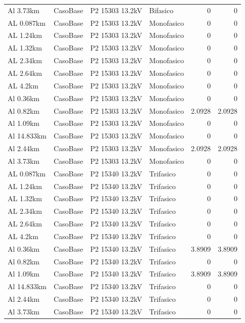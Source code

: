 \documentclass[11pt,a4paper]{article}
\begin{document}
\begin{longtable}{llllrr}
Al 3.73km & CasoBase & P2 15303 13.2kV & Bifasico & 0 & 0 \\
AL 0.087km & CasoBase & P2 15303 13.2kV & Monofasico & 0 & 0 \\
AL 1.24km & CasoBase & P2 15303 13.2kV & Monofasico & 0 & 0 \\
AL 1.32km & CasoBase & P2 15303 13.2kV & Monofasico & 0 & 0 \\
AL 2.34km & CasoBase & P2 15303 13.2kV & Monofasico & 0 & 0 \\
AL 2.64km & CasoBase & P2 15303 13.2kV & Monofasico & 0 & 0 \\
AL 4.2km & CasoBase & P2 15303 13.2kV & Monofasico & 0 & 0 \\
Al 0.36km & CasoBase & P2 15303 13.2kV & Monofasico & 0 & 0 \\
Al 0.82km & CasoBase & P2 15303 13.2kV & Monofasico & 2.0928 & 2.0928 \\
Al 1.09km & CasoBase & P2 15303 13.2kV & Monofasico & 0 & 0 \\
Al 14.833km & CasoBase & P2 15303 13.2kV & Monofasico & 0 & 0 \\
Al 2.44km & CasoBase & P2 15303 13.2kV & Monofasico & 2.0928 & 2.0928 \\
Al 3.73km & CasoBase & P2 15303 13.2kV & Monofasico & 0 & 0 \\
AL 0.087km & CasoBase & P2 15340 13.2kV & Trifasico & 0 & 0 \\
AL 1.24km & CasoBase & P2 15340 13.2kV & Trifasico & 0 & 0 \\
AL 1.32km & CasoBase & P2 15340 13.2kV & Trifasico & 0 & 0 \\
AL 2.34km & CasoBase & P2 15340 13.2kV & Trifasico & 0 & 0 \\
AL 2.64km & CasoBase & P2 15340 13.2kV & Trifasico & 0 & 0 \\
AL 4.2km & CasoBase & P2 15340 13.2kV & Trifasico & 0 & 0 \\
Al 0.36km & CasoBase & P2 15340 13.2kV & Trifasico & 3.8909 & 3.8909 \\
Al 0.82km & CasoBase & P2 15340 13.2kV & Trifasico & 0 & 0 \\
Al 1.09km & CasoBase & P2 15340 13.2kV & Trifasico & 3.8909 & 3.8909 \\
Al 14.833km & CasoBase & P2 15340 13.2kV & Trifasico & 0 & 0 \\
Al 2.44km & CasoBase & P2 15340 13.2kV & Trifasico & 0 & 0 \\
Al 3.73km & CasoBase & P2 15340 13.2kV & Trifasico & 0 & 0 \\

\end{longtable}
\end{document}
